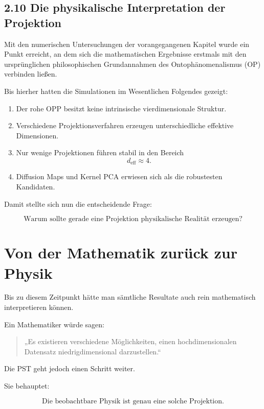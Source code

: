 \subsection{2.10 Die physikalische Interpretation der Projektion}

Mit den numerischen Untersuchungen der vorangegangenen Kapitel wurde ein Punkt erreicht, an dem sich die mathematischen Ergebnisse erstmals mit den ursprünglichen philosophischen Grundannahmen des Ontophänomenalismus (OP) verbinden ließen.

Bis hierher hatten die Simulationen im Wesentlichen Folgendes gezeigt:

\begin{enumerate}
\item Der rohe OPP besitzt keine intrinsische vierdimensionale Struktur.
\item Verschiedene Projektionsverfahren erzeugen unterschiedliche effektive Dimensionen.
\item Nur wenige Projektionen führen stabil in den Bereich
\[
d_{\mathrm{eff}}\approx4.
\]
\item Diffusion Maps und Kernel PCA erwiesen sich als die robustesten Kandidaten.
\end{enumerate}

Damit stellte sich nun die entscheidende Frage:

\[
\boxed{
\text{Warum sollte gerade eine Projektion physikalische Realität erzeugen?}
}
\]


\section*{Von der Mathematik zurück zur Physik}

Bis zu diesem Zeitpunkt hätte man sämtliche Resultate auch rein mathematisch interpretieren können.

Ein Mathematiker würde sagen:

\begin{quote}
„Es existieren verschiedene Möglichkeiten, einen hochdimensionalen Datensatz niedrigdimensional darzustellen.“
\end{quote}

Die PST geht jedoch einen Schritt weiter.

Sie behauptet:

\[
\boxed{
\text{Die beobachtbare Physik ist genau eine solche Projektion.}
}
\]

